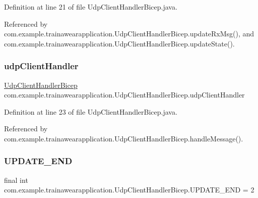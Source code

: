 Definition at line 21 of file Udp\+Client\+Handler\+Bicep.\+java.



Referenced by com.\+example.\+trainawearapplication.\+Udp\+Client\+Handler\+Bicep.\+update\+Rx\+Msg(), and com.\+example.\+trainawearapplication.\+Udp\+Client\+Handler\+Bicep.\+update\+State().

\mbox{\label{classcom_1_1example_1_1trainawearapplication_1_1_udp_client_handler_bicep_ad3a0ed8d7e52b90b68d92d0eb891391b}} 
\subsubsection{\texorpdfstring{udpClientHandler}{udpClientHandler}}
{\footnotesize\ttfamily \mbox{\hyperlink{classcom_1_1example_1_1trainawearapplication_1_1_udp_client_handler_bicep}{Udp\+Client\+Handler\+Bicep}} com.\+example.\+trainawearapplication.\+Udp\+Client\+Handler\+Bicep.\+udp\+Client\+Handler\hspace{0.3cm}{\ttfamily [package]}}



Definition at line 23 of file Udp\+Client\+Handler\+Bicep.\+java.



Referenced by com.\+example.\+trainawearapplication.\+Udp\+Client\+Handler\+Bicep.\+handle\+Message().

\mbox{\label{classcom_1_1example_1_1trainawearapplication_1_1_udp_client_handler_bicep_a70806fb9d5d3e9626218321b083d9b36}} 
\subsubsection{\texorpdfstring{UPDATE\_END}{UPDATE\_END}}
{\footnotesize\ttfamily final int com.\+example.\+trainawearapplication.\+Udp\+Client\+Handler\+Bicep.\+U\+P\+D\+A\+T\+E\+\_\+\+E\+ND = 2\hspace{0.3cm}{\ttfamily [static]}}



